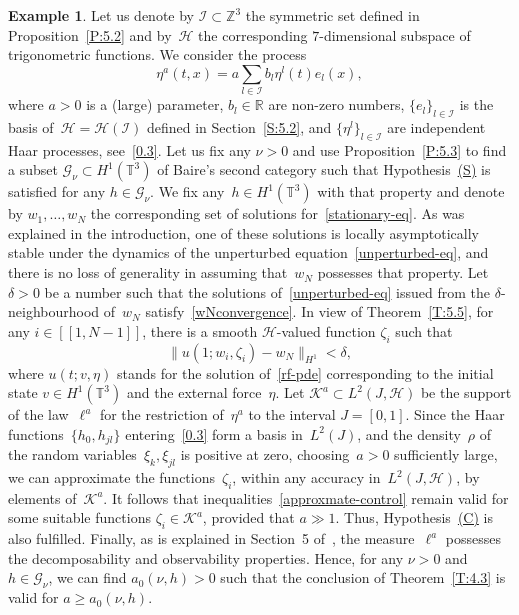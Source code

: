 \documentclass[11pt]{article}
\theoremstyle{plain}
\theoremstyle{definition}
\newtheorem{example}[theorem]{Example}
\let\mathcal\mathscr
\theoremstyle{plain}
\numberwithin{equation}{section}
\newcommand{\R}{{\mathbb R}}
\newcommand{\Z}{{\mathbb Z}}
\newcommand{\T}{{\mathbb T}}
\newcommand{\GG}{{\mathcal G}}
\newcommand{\HH}{{\mathcal H}}
\newcommand{\II}{{\mathcal I}}
\newcommand{\KK}{{\mathcal K}}
\begin{document}
\begin{example}
Let us denote by $\II\subset\Z^3$ the symmetric set defined in Proposition~\ref{P:5.2} and by~$\HH$ the corresponding $7$-dimensional subspace of trigonometric functions. We consider the process
\begin{equation*}
\eta^a(t,x)=a\sum_{l\in\II}b_l\eta^l(t)e_l(x),
\end{equation*}
where $a>0$ is a (large) parameter, $b_l\in\R$ are non-zero numbers, $\{e_l\}_{l\in\II}$ is the basis of~$\HH=\HH(\II)$ defined in Section~\ref{S:5.2}, and $\{\eta^l\}_{l\in\II}$ are independent Haar processes, see~\eqref{0.3}. Let us fix any $\nu>0$ and use Proposition~\ref{P:5.3} to find a subset $\GG_\nu\subset H^1(\T^3)$ of Baire's second category such that Hypothesis~\hyperlink{S}{(S)} is satisfied for any $h\in\GG_\nu$. We fix any~$h\in H^1(\T^3)$ with that property and denote by $w_1,\dots,w_N$ the corresponding set of solutions for~\eqref{stationary-eq}. As was explained in the introduction, one of these solutions is locally asymptotically stable under the dynamics of the unperturbed equation~\eqref{unperturbed-eq}, and there is no loss of generality in assuming that~$w_N$ possesses that property. Let $\delta>0$ be a number such that the solutions of~\eqref{unperturbed-eq} issued from the $\delta$-neighbourhood of~$w_N$ satisfy~\eqref{wNconvergence}. In view of Theorem~\ref{T:5.5}, for any $i\in[\![1,N-1]\!]$, there is a smooth $\HH$-valued function $\zeta_i$ such that
\begin{equation} \label{approxmate-control}
\|u(1;w_i,\zeta_i)-w_N\|_{H^1}<\delta,
\end{equation}
where $u(t;v,\eta)$ stands for the solution of~\eqref{rf-pde} corresponding to the initial state $v\in H^1(\T^3)$ and the external force~$\eta$. Let $\KK^a\subset L^2(J,\HH)$ be the support of the law~$\ell^a$ for the restriction of~$\eta^a$ to the interval $J=[0,1]$. Since the Haar functions~$\{h_0,h_{jl}\}$ entering~\eqref{0.3} form a basis in~$L^2(J)$, and the density~$\rho$ of the random variables~$\xi_k,\xi_{jl}$ is positive at zero, choosing~$a>0$ sufficiently large, we can approximate the functions~$\zeta_i$, within any accuracy in~$L^2(J,\HH)$, by elements of~$\KK^a$. It follows that inequalities~\eqref{approxmate-control} remain valid for some suitable functions $\zeta_i\in\KK^a$, provided that $a\gg1$. Thus, Hypothesis~\hyperlink{C}{(C)} is also fulfilled. Finally, as is explained in Section~5 of~\cite{KNS-2020}, the measure~$\ell^a$ possesses the decomposability and observability properties. Hence, for any $\nu>0$ and $h\in \GG_\nu$, we can find $a_0(\nu,h)>0$ such that the conclusion of Theorem~\ref{T:4.3} is valid for $a\ge a_0(\nu,h)$.
\end{example}
\end{document}

